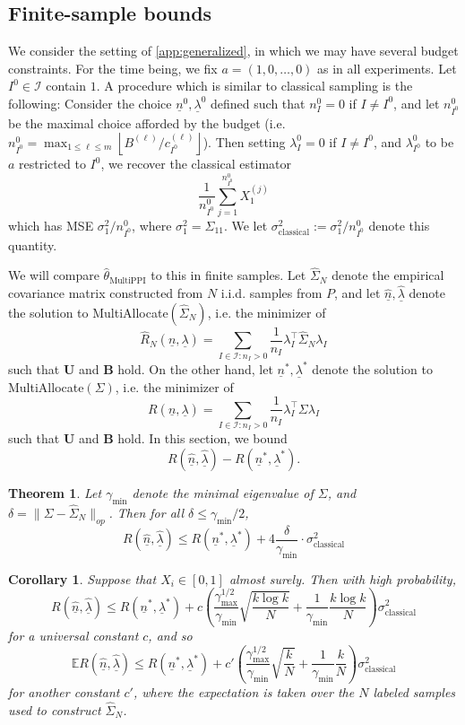\documentclass{article} %
\newtheorem{theorem}{Theorem}
\newtheorem{corollary}[corollary]{Corollary}
\newcommand{\wh}[1]{\widehat{#1}}
\newcommand{\ul}[1]{\underline{#1}}
\DeclareMathOperator{\classical}{classical}
\begin{document}
\subsection{Finite-sample bounds}
\label{app:finite-sample-bounds}
We consider the setting of \autoref{app:generalized}, in which we may have several budget constraints. For the time being, we fix $a=(1,0,\dots,0)$ as in all experiments. Let $I^0\in\mathcal{I}$ contain $1$. A procedure which is similar to classical sampling is the following: Consider the choice $\ul{n}^0,\ul{\lambda}^0$ defined such that $n^0_I=0$ if $I\neq I^0$, and let $n^0_{I^0}$ be the maximal choice afforded by the budget (i.e. $n^0_{I^0} = \max_{1\leq \ell\leq m}\left \lfloor B^{(\ell)}/c_{I^0}^{(\ell)}\right\rfloor$). Then setting $\lambda^0_I=0$ if $I\neq I^0$, and $\lambda^0_{I^0}$ to be $a$ restricted to $I^0$, we recover the classical estimator
\[
\frac{1}{n^0_{I^0}} \sum_{j=1}^{n^0_{I^0}} X_1^{(j)}
\]
which has MSE $\sigma^2_1/n^0_{I^0}$, where $\sigma_1^2=\Sigma_{11}$. We let $\sigma^2_{\text{classical}}:=\sigma^2_1/n^0_{I^0}$ denote this quantity.

We will compare $\hat{\theta}_{\text{MultiPPI}}$ to this in finite samples. Let $\wh{\Sigma}_N$ denote the empirical covariance matrix constructed from $N$ i.i.d. samples from $P$, and let $\wh{\underline{n}},\wh{\underline{\lambda}}$ denote the solution to MultiAllocate$(\wh{\Sigma}_N)$, i.e. the minimizer of
\[
\wh{R}_N(\ul{n},\ul{\lambda}) = \sum_{I\in\mathcal{I}:n_I>0}\frac{1}{n_I}\lambda_I^\top\wh{\Sigma}_N\lambda_I
\]
such that $\mathbf{U}$ and $\mathbf{B}$ hold. On the other hand, let ${\ul{n}}^*,{\ul{\lambda}}^*$ denote the solution to MultiAllocate$(\Sigma)$, i.e. the minimizer of
\[
R(\ul{n},\ul{\lambda}) = \sum_{I\in\mathcal{I}:n_I>0}\frac{1}{n_I}\lambda_I^\top\Sigma\lambda_I
\]
such that $\mathbf{U}$ and $\mathbf{B}$ hold. In this section, we bound
\[
R(\wh{\ul{n}},\wh{\ul{\lambda}}) - R({\ul{n}}^*,{\ul{\lambda}}^*).
\]

\begin{theorem}\label{thm:finite-sample-v2-1}
    Let $\gamma_{\min}$ denote the minimal eigenvalue of $\Sigma$, and $\delta=\|\Sigma-\wh{\Sigma}_N\|_{op}$. Then for all $\delta\leq\gamma_{\min}/2$,
    \[
    R(\wh{\ul{n}},\wh{\ul{\lambda}}) \leq R({\ul{n}}^*,{\ul{\lambda}}^*) + 4\frac{\delta}{\gamma_{\min}}\cdot \sigma^2_{\classical}
    \]
\end{theorem}

\begin{corollary}\label{cor:bounded}
    Suppose that $X_i\in[0,1]$ almost surely. Then with high probability,
    \[
    R(\wh{\ul{n}},\wh{\ul{\lambda}}) \leq R({\ul{n}}^*,{\ul{\lambda}}^*) + c\left(\frac{\gamma_{\max}^{1/2}}{\gamma_{\min}} \sqrt{\frac{k\log k}{N}} + \frac{1}{\gamma_{\min}}\frac{k\log k}{N}\right) \sigma^2_{\classical}
    \]
    for a universal constant $c$, and so
    \[
    \mathbb{E}R(\wh{\ul{n}},\wh{\ul{\lambda}}) \leq R({\ul{n}}^*,{\ul{\lambda}}^*) + c'\left(\frac{\gamma_{\max}^{1/2}}{\gamma_{\min}} \sqrt{\frac{k}{N}} + \frac{1}{\gamma_{\min}} \frac{k}{N}\right)\sigma^2_{\classical}
    \]
    for another constant $c'$, where the expectation is taken over the $N$ labeled samples used to construct $\wh{\Sigma}_N$.
\end{corollary}
\end{document}
